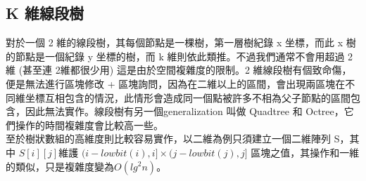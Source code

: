 \documentclass{article}
\begin{document}
\subsection{K 維線段樹}
對於一個 2 維的線段樹，其每個節點是一棵樹，第一層樹紀錄 x 坐標，而此 x 樹的節點是一個紀錄 y 坐標的樹，而 k 維則依此類推。不過我們通常不會用超過 2 維 (甚至連 2維都很少用) 這是由於空間複雜度的限制。2 維線段樹有個致命傷，便是無法進行區塊修改 + 區塊詢問，因為在二維以上的區間，會出現兩區塊在不同維坐標互相包含的情況，此情形會造成同一個點被許多不相為父子節點的區間包含，因此無法實作。線段樹有另一個generalization 叫做 Quadtree 和 Octree，它們操作的時間複雜度會比較高一些。\\
至於樹狀數組的高維度則比較容易實作，以二維為例只須建立一個二維陣列 S，其中 $S[i][j]$維護 $(i − lowbit(i), i] × (j − lowbit(j), j]$ 區塊之值，其操作和一維的類似，只是複雜度變為$O(lg^2 n)$。
\end{document}
